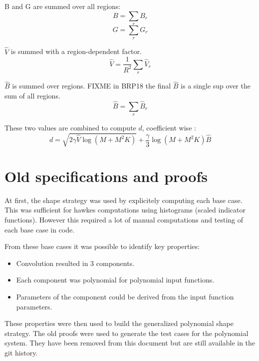 \documentclass[a4paper,10pt]{article}
\begin{document}
B and G are summed over all regions:
\[ B = \sum_r B_r \]
\[ G = \sum_r G_r \]

$\widehat{V}$ is summed with a region-dependent factor.
\[ \widehat{V} = \frac{1}{R^2} \sum_r \widehat{V}_r \]

$\widehat{B}$ is summed over regions. FIXME in BRP18 the final $\widehat{B}$ is a single sup over the sum of all regions.
\[ \widehat{B} = \sum_r \widehat{B}_r \]

These two values are combined to compute $d$, coefficient wise :
\[
    d =
    \sqrt{2 \gamma \widehat{V} \log(M + M^2 K) } +
    \frac{\gamma}{3} \log(M + M^2 K) \widehat{B}
\]

\section{Old specifications and proofs}

At first, the shape strategy was used by explicitely computing each base case.
This was sufficient for hawkes computations using histograms (scaled indicator functions).
However this required a lot of manual computations and testing of each base case in code.

From these base cases it was possible to identify key properties:
\begin{itemize}
    \item Convolution resulted in 3 components.
    \item Each component was polynomial for polynomial input functions.
    \item Parameters of the component could be derived from the input function parameters.
\end{itemize}

These properties were then used to build the generalized polynomial shape strategy.
The old proofs were used to generate the test cases for the polynomial system.
They have been removed from this document but are still available in the git history.

\end{document}
